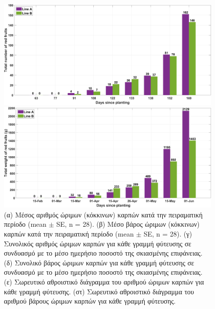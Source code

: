 \documentclass[12pt, a4paper]{report} %
\newcommand{\english}{\foreignlanguage{english}}
\begin{document}
\begin{figure}[H]
\begin{adjustwidth}{-0.5cm}{0cm}
        \begin{minipage}[c]{0.5\textwidth}
            \centering
            \includegraphics[scale=0.05]{red_weight_e.jpg}
            \caption*{\hspace{35pt}(ε)}{}
        \end{minipage}
        \hfill
        \begin{minipage}[c]{0.5\textwidth}
            \centering
            \includegraphics[scale=0.05]{red_weight_f.jpg}
            \caption*{\hspace{35pt}(στ)}{}
        \end{minipage}
    \end{adjustwidth}
        
    \caption{(α) Μέσος αριθμός ώριμων (κόκκινων) καρπών κατά την πειραματική περίοδο (\english{mean $\pm$ SE, n = 28}). 
    (β) Μέσο βάρος ώριμων (κόκκινων) καρπών κατά την πειραματική περίοδο (\english{mean $\pm$ SE, n = 28}). (γ) Συνολικός 
    αριθμός ώριμων καρπών για κάθε γραμμή φύτευσης σε συνδυασμό με το μέσο ημερήσιο ποσοστό της σκιασμένης επιφάνειας. 
    (δ) Συνολικό βάρος ώριμων καρπών για κάθε γραμμή φύτευσης σε συνδυασμό με το μέσο ημερήσιο ποσοστό της σκιασμένης 
    επιφάνειας. (ε) Σωρευτικό αθροιστικό διάγραμμα του αριθμού ώριμων καρπών για κάθε γραμμή φύτευσης. (στ) Σωρευτικό 
    αθροιστικό διάγραμμα του αριθμού βάρους ώριμων καρπών για κάθε γραμμή φύτευσης.}
    \label{fig_red_weight}
\end{figure}
\end{document}
